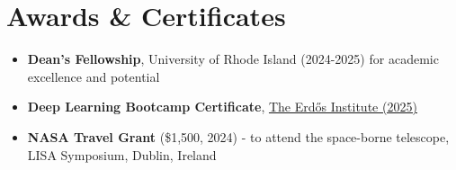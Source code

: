 \documentclass[letterpaper,11pt]{article}
\begin{document}
\section{Awards \& Certificates}
  \begin{itemize}[leftmargin=0.15in, label={}, noitemsep]
      \item \textbf{Dean's Fellowship}, University of Rhode Island (2024-2025) for academic excellence and potential
      \item \textbf{Deep Learning Bootcamp Certificate},
      \href{https://www.erdosinstitute.org/certificates/fall-2025/deep-learning-boot-camp/ritesh-bachhar/c453e3ff-c2cb-470c-af89-549bedad8fc4}{\underline{The Erd\H{o}s Institute (2025)}}
      \item \textbf{NASA Travel Grant} (\$1,500, 2024) - to attend the space-borne telescope, LISA Symposium, Dublin, Ireland
  \end{itemize}



\end{document}

